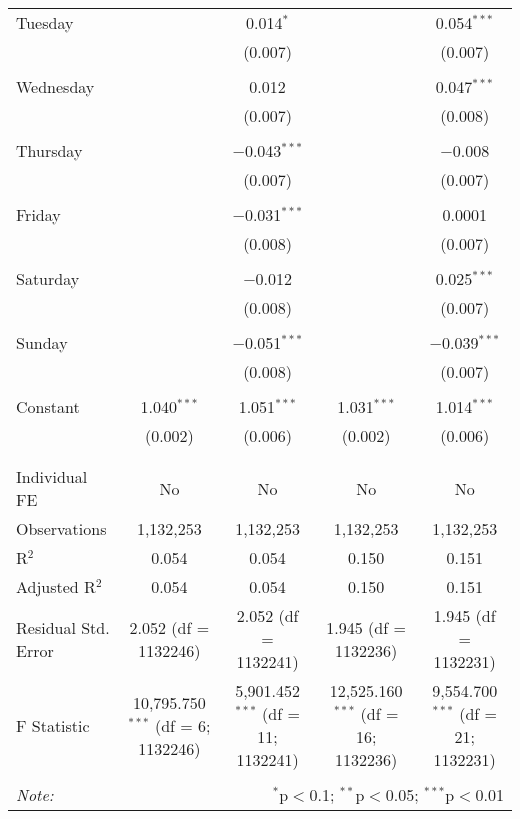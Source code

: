 \documentclass[
]{article}
\begin{document}
\begin{table}[!htbp]
{\begin{tabular}{@{\extracolsep{5pt}}lcccc}
 Tuesday &  & 0.014$^{*}$ &  & 0.054$^{***}$ \\ 
  &  & (0.007) &  & (0.007) \\ 
  & & & & \\ 
 Wednesday &  & 0.012 &  & 0.047$^{***}$ \\ 
  &  & (0.007) &  & (0.008) \\ 
  & & & & \\ 
 Thursday &  & $-$0.043$^{***}$ &  & $-$0.008 \\ 
  &  & (0.007) &  & (0.007) \\ 
  & & & & \\ 
 Friday &  & $-$0.031$^{***}$ &  & 0.0001 \\ 
  &  & (0.008) &  & (0.007) \\ 
  & & & & \\ 
 Saturday &  & $-$0.012 &  & 0.025$^{***}$ \\ 
  &  & (0.008) &  & (0.007) \\ 
  & & & & \\ 
 Sunday &  & $-$0.051$^{***}$ &  & $-$0.039$^{***}$ \\ 
  &  & (0.008) &  & (0.007) \\ 
  & & & & \\ 
 Constant & 1.040$^{***}$ & 1.051$^{***}$ & 1.031$^{***}$ & 1.014$^{***}$ \\ 
  & (0.002) & (0.006) & (0.002) & (0.006) \\ 
  & & & & \\ 
\hline \\[-1.8ex] 
Individual FE & No & No & No & No \\ 
Observations & 1,132,253 & 1,132,253 & 1,132,253 & 1,132,253 \\ 
R$^{2}$ & 0.054 & 0.054 & 0.150 & 0.151 \\ 
Adjusted R$^{2}$ & 0.054 & 0.054 & 0.150 & 0.151 \\ 
Residual Std. Error & 2.052 (df = 1132246) & 2.052 (df = 1132241) & 1.945 (df = 1132236) & 1.945 (df = 1132231) \\ 
F Statistic & 10,795.750$^{***}$ (df = 6; 1132246) & 5,901.452$^{***}$ (df = 11; 1132241) & 12,525.160$^{***}$ (df = 16; 1132236) & 9,554.700$^{***}$ (df = 21; 1132231) \\ 
\hline 
\hline \\[-1.8ex] 
\textit{Note:}  & \multicolumn{4}{r}{$^{*}$p$<$0.1; $^{**}$p$<$0.05; $^{***}$p$<$0.01} \\ 
\end{tabular}
} 
\end{table} 
\newpage
\end{document}
